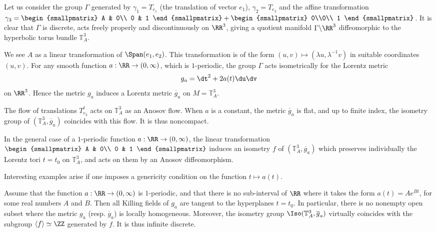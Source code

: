 Let us consider the group $\Gamma$ generated by $\gamma_1=T_{e_1}$ (the translation of vector $e_1$), $\gamma_2=T_{e_2}$ and the affine transformation $\gamma_3=
\begin{smallpmatrix} A & 0\\ 0 & 1
\end{smallpmatrix} +
\begin{smallpmatrix} 0\\0\\ 1
\end{smallpmatrix}$.
It is clear that $\Gamma$ is discrete, acts freely properly and discontinuously on $\RR^3$, giving a quotient manifold $\Gamma \backslash \RR^3$ diffeomorphic to the hyperbolic torus bundle ${\mathbb T}_A^3$.


We see $A$ as a linear transformation of $\Span(e_1,e_2)$. This transformation is of the form $(u,v) \mapsto (\lambda u, \lambda^{-1}v)$ in suitable coordinates $(u,v)$. For any smooth function $a: \RR \to (0,\infty)$, which is $1$-periodic, the group $\Gamma$ acts isometrically for the Lorentz metric
\[
g_a=\dt^2+2a(t)\du\dv
\]
on $\RR^3$. Hence the metric $g_a$ induces a Lorentz metric $\overline{g}_a$ on $M={\mathbb T}_A^3$.

The flow of translations $T_{e_3}^t$ acts on ${\mathbb T}_A^3$ as an Anosov flow. When $a$ is a constant, the metric $\overline{g}_a$ is flat, and up to finite index, the isometry group of $({\mathbb T}_A^3,\overline{g}_a)$ coincides with this flow. It is thus noncompact.

In the general case of a $1$-periodic function $a: \RR \to (0,\infty)$, the linear transformation $
\begin{smallpmatrix} A & 0\\ 0 & 1
\end{smallpmatrix}$ induces an isometry $f$ of
$({\mathbb T}_A^3,\overline{g}_a)$ which preserves individually the Lorentz tori $t=t_0$ on ${\mathbb T}_A^3$, and acts on them by an Anosov diffeomorphism.

Interesting examples arise if one imposes a genericity condition on the function $t \mapsto a(t)$.


\begin{lemm}\label{lem.calcul.killing}
Assume that the function $a: \RR \to (0,\infty)$ is $1$-periodic, and that there is no sub-interval of $\RR$ where it takes the form $a(t)=Ae^{Bt}$, for some real numbers $A$ and $B$. Then all Killing fields of $g_a$ are tangent to the hyperplanes $t=t_0$. In particular, there is no nonempty open subset where the metric $g_a$ (resp. $\overline{g}_a$) is locally homogeneous. Moreover, the isometry group $\Iso({\mathbb T}_A^3,\overline{g}_a)$ virtually coincides with the subgroup $\langle f \rangle \simeq \ZZ$ generated by $f$. It is thus infinite discrete.
\end{lemm}

